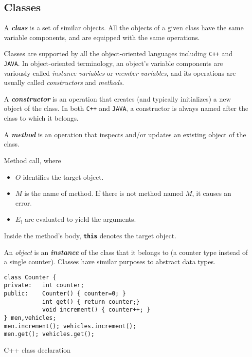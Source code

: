 \subsection{Classes}
\label{subsec:classes}

A \textit{\textbf{class}} is a set of similar objects. All the objects of a given class have the same variable components, and are equipped with the same operations.

Classes are supported by all the object-oriented languages including \texttt{C++} and \texttt{JAVA}. In object-oriented terminology, an object's variable components are variously called \textit{instance variables} or \textit{member variables}, and its operations are usually called \textit{constructors} and \textit{methods}.

A \textit{\textbf{constructor}} is an operation that creates (and typically initializes) a new object of the class. In both \texttt{C++} and \texttt{JAVA}, a constructor is always named after the class to which it belongs.

A \textit{\textbf{method}} is an operation that inspects and/or updates an existing object of the class.

\noindent Method call,
where
\begin{itemize}
  \item $O$ identifies the target object.
  \item $M$ is the name of method. If there is not method named $M$, it causes an error.
  \item $E_i$ are evaluated to yield the arguments.
\end{itemize}
Inside the method's body, \textbf{\texttt{this}} denotes the target object.

An \textit{object} is an \textit{\textbf{instance}} of the class that it belongs to (a counter type instead of a single counter). Classes have similar purposes to abstract data types.
\begin{listing}[H]

\begin{verbatim}
class Counter {
private:   int counter;
public:    Counter() { counter=0; }
           int get() { return counter;}
           void increment() { counter++; }
} men,vehicles;
men.increment(); vehicles.increment();
men.get(); vehicles.get();
\end{verbatim}
\caption{C++ class declaration}
\label{code:code3}
\end{listing}

